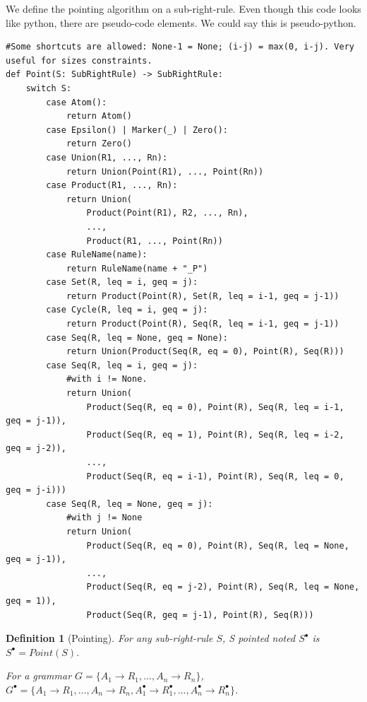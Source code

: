 \documentclass{article}
\newtheorem{definition}{Definition}
\begin{document}
We define the pointing algorithm on a sub-right-rule. Even though this code looks like python, there are pseudo-code elements. We could say this is pseudo-python.
\begin{lstlisting}
#Some shortcuts are allowed: None-1 = None; (i-j) = max(0, i-j). Very useful for sizes constraints.
def Point(S: SubRightRule) -> SubRightRule:
	switch S:
		case Atom():
			return Atom()
		case Epsilon() | Marker(_) | Zero():
			return Zero()
		case Union(R1, ..., Rn):
			return Union(Point(R1), ..., Point(Rn))
		case Product(R1, ..., Rn):
			return Union(	
				Product(Point(R1), R2, ..., Rn),
				...,
				Product(R1, ..., Point(Rn))
		case RuleName(name):
			return RuleName(name + "_P")
		case Set(R, leq = i, geq = j):
			return Product(Point(R), Set(R, leq = i-1, geq = j-1))
		case Cycle(R, leq = i, geq = j):
			return Product(Point(R), Seq(R, leq = i-1, geq = j-1))
		case Seq(R, leq = None, geq = None):
			return Union(Product(Seq(R, eq = 0), Point(R), Seq(R)))
		case Seq(R, leq = i, geq = j):
			#with i != None.
			return Union(
				Product(Seq(R, eq = 0), Point(R), Seq(R, leq = i-1, geq = j-1)),
				Product(Seq(R, eq = 1), Point(R), Seq(R, leq = i-2, geq = j-2)),
				...,
				Product(Seq(R, eq = i-1), Point(R), Seq(R, leq = 0, geq = j-i)))
		case Seq(R, leq = None, geq = j):
			#with j != None
			return Union(
				Product(Seq(R, eq = 0), Point(R), Seq(R, leq = None, geq = j-1)),
				...,
				Product(Seq(R, eq = j-2), Point(R), Seq(R, leq = None, geq = 1)),
				Product(Seq(R, geq = j-1), Point(R), Seq(R)))
\end{lstlisting}

\begin{definition}[Pointing]
For any sub-right-rule $S$, S pointed noted $S^{\bullet}$ is $S^{\bullet} = Point(S)$.

For a grammar $G = \{A_1\rightarrow R_1, ..., A_n\rightarrow R_n\}$, $G^{\bullet} = \{A_1\rightarrow R_1, ..., A_n\rightarrow R_n, A_1^{\bullet}\rightarrow R_1^{\bullet}, ..., A_n^{\bullet}\rightarrow R_n^{\bullet}\}$.

\end{definition}
\end{document}
